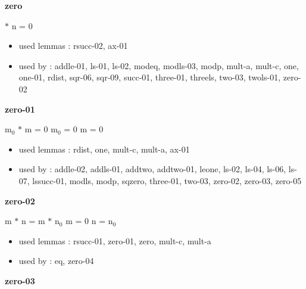 \documentclass[a4paper]{article}
\begin{document}
\medskip

\bigskip

{\large\bf zero}

\medskip

  $*$ n = 0

\begin{itemize}


\item       used lemmas  : rsucc-02, ax-01
\item       used by      : addle-01, ls-01, ls-02, modeq, modls-03, modp, mult-a, mult-c, one, one-01, rdist, sqr-06, sqr-09, succ-01, three-01, threels, two-03, twols-01, zero-02

\end{itemize}

\medskip

\bigskip

{\large\bf zero-01}

\medskip

 \Fol $\mbox{m}_{0}$ $*$ m = 0 \Equiv $\mbox{m}_{0}$ = 0 \Or m = 0

\begin{itemize}


\item       used lemmas  : rdist, one, mult-c, mult-a, ax-01
\item       used by      : addle-02, addls-01, addtwo, addtwo-01, leone, ls-02, ls-04, ls-06, ls-07, lssucc-01, modls, modp, sqzero, three-01, two-03, zero-02, zero-03, zero-05

\end{itemize}

\medskip

\bigskip

{\large\bf zero-02}

\medskip

 \Fol m $*$ n = m $*$ $\mbox{n}_{0}$ \Equiv m = 0 \Or n = $\mbox{n}_{0}$

\begin{itemize}


\item       used lemmas  : rsucc-01, zero-01, zero, mult-c, mult-a
\item       used by      : eq, zero-04

\end{itemize}

\medskip

\bigskip

{\large\bf zero-03}

\medskip
\end{document}
